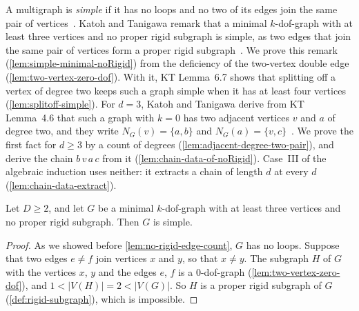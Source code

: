 A multigraph is \emph{simple} if it has no loops and no two of its
edges join the same pair of vertices~\cite[p.~668]{katohTanigawa2011}.
Katoh and Tanigawa remark that a minimal $k$-dof-graph with at least
three vertices and no proper rigid subgraph is simple, as two edges that
join the same pair of vertices form a proper rigid
subgraph~\cite[p.~677]{katohTanigawa2011}. We prove this remark
(\cref{lem:simple-minimal-noRigid}) from the deficiency of the
two-vertex double edge (\cref{lem:two-vertex-zero-dof}). With it, KT
Lemma~6.7 shows that splitting off a vertex of degree two keeps such a
graph simple when it has at least four vertices
(\cref{lem:splitoff-simple}). For $d = 3$, Katoh and
Tanigawa derive from KT Lemma~4.6 that such a graph with $k = 0$ has two adjacent vertices $v$
and $a$ of degree two, and they write $N_G(v) = \{a, b\}$ and
$N_G(a) = \{v, c\}$~\cite[p.~680]{katohTanigawa2011}.
We prove the first fact for $d \ge 3$ by a count of degrees
(\cref{lem:adjacent-degree-two-pair}), and derive the chain $b\,v\,a\,c$
from it (\cref{lem:chain-data-of-noRigid}). Case~III of the algebraic
induction uses neither: it extracts a chain of length $d$ at every $d$
(\cref{lem:chain-data-extract}).

\begin{lemma}
  \label{lem:simple-minimal-noRigid}
  \leanok
  Let $D \ge 2$, and let $G$ be a minimal $k$-dof-graph with at least
  three vertices and no proper rigid subgraph. Then $G$ is simple.
\end{lemma}
\begin{proof}
  \leanok
  As we showed before \cref{lem:no-rigid-edge-count}, $G$ has no loops.
  Suppose that two edges $e \neq f$ join vertices $x$ and $y$, so that
  $x \neq y$. The subgraph $H$ of $G$ with the vertices $x$, $y$ and the
  edges $e$, $f$ is a $0$-dof-graph (\cref{lem:two-vertex-zero-dof}),
  and $1 < |V(H)| = 2 < |V(G)|$. So $H$ is a proper rigid subgraph of
  $G$ (\cref{def:rigid-subgraph}), which is impossible.
\end{proof}

